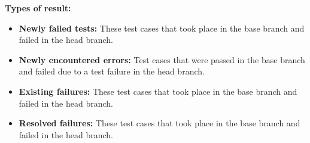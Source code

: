 \textbf{Types of result:}

\begin{itemize}
\item \textbf{Newly failed tests:} These test cases that took place in the base branch and failed
in the head branch.
\item \textbf{Newly encountered errors:} Test cases that were passed in the base branch and
failed due to a test failure in the head branch.
\item \textbf{Existing failures:} These test cases that took place in the base branch and failed
in the head branch.
\item \textbf{Resolved failures:} These test cases that took place in the base branch and failed
in the head branch. 
\end{itemize}




